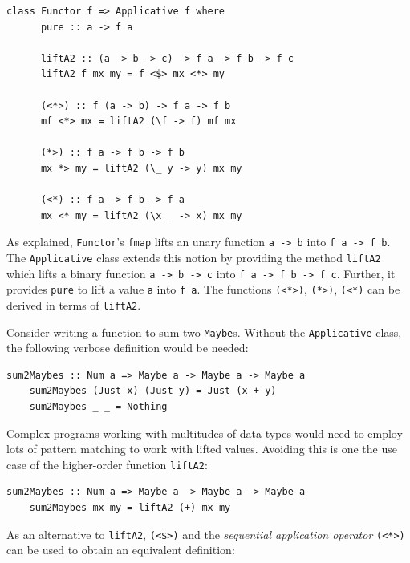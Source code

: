\documentclass[UdineBachThesis,american,11pt]{PhdThesis}
\begin{document}
  \begin{Verbatim}[gobble=4,fontsize=\small]
    class Functor f => Applicative f where
      pure :: a -> f a

      liftA2 :: (a -> b -> c) -> f a -> f b -> f c
      liftA2 f mx my = f <$> mx <*> my

      (<*>) :: f (a -> b) -> f a -> f b
      mf <*> mx = liftA2 (\f -> f) mf mx

      (*>) :: f a -> f b -> f b
      mx *> my = liftA2 (\_ y -> y) mx my

      (<*) :: f a -> f b -> f a
      mx <* my = liftA2 (\x _ -> x) mx my
  \end{Verbatim}

  As explained, \mbox{\texttt{Functor}}'s \mbox{\texttt{fmap}} lifts an unary
  function \mbox{\texttt{a -> b}} into \mbox{\texttt{f a -> f b}}. The
  \mbox{\texttt{Applicative}} class extends this notion by providing the method
  \mbox{\texttt{liftA2}} which lifts a binary function
  \mbox{\texttt{a -> b -> c}} into \mbox{\texttt{f a -> f b -> f c}}. Further,
  it provides \mbox{\texttt{pure}} to lift a value \texttt{a} into
  \mbox{\texttt{f a}}. The functions \mbox{\texttt{(<*>)}},
  \mbox{\texttt{(*>)}}, \mbox{\texttt{(<*)}} can be derived in terms of
  \mbox{\texttt{liftA2}}.

  Consider writing a function to sum two \mbox{\texttt{Maybe}s}. Without the
  \mbox{\texttt{Applicative}} class, the following verbose definition would be
  needed:

  \begin{Verbatim}[gobble=4,fontsize=\small]
    sum2Maybes :: Num a => Maybe a -> Maybe a -> Maybe a
    sum2Maybes (Just x) (Just y) = Just (x + y)
    sum2Maybes _ _ = Nothing
  \end{Verbatim}

  Complex programs working with multitudes of data types would need to employ
  lots of pattern matching to work with lifted values. Avoiding this is one the
  use case of the higher-order function \mbox{\texttt{liftA2}}:

  \begin{Verbatim}[gobble=4,fontsize=\small]
    sum2Maybes :: Num a => Maybe a -> Maybe a -> Maybe a
    sum2Maybes mx my = liftA2 (+) mx my
  \end{Verbatim}

  As an alternative to \mbox{\texttt{liftA2}}, \mbox{\texttt{(<\$>)}} and the
  \emph{sequential application operator} \mbox{\texttt{(<*>)}} can be used to
  obtain an equivalent definition:
\end{document}
